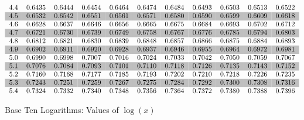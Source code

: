 \documentclass[12pt]{article}
\begin{document}
\begin{equation*}
\begin{tabular}{*{11}{c}}
4.4 & 0.6435 & 0.6444 & 0.6454 & 0.6464 & 0.6474 & 0.6484 & 0.6493 & 0.6503 & 0.6513 & 0.6522 \\
\rowcolor[gray]{0.75}
4.5 & 0.6532 & 0.6542 & 0.6551 & 0.6561 & 0.6571 & 0.6580 & 0.6590 & 0.6599 & 0.6609 & 0.6618 \\
4.6 & 0.6628 & 0.6637 & 0.6646 & 0.6656 & 0.6665 & 0.6675 & 0.6684 & 0.6693 & 0.6702 & 0.6712 \\
\rowcolor[gray]{0.75}
4.7 & 0.6721 & 0.6730 & 0.6739 & 0.6749 & 0.6758 & 0.6767 & 0.6776 & 0.6785 & 0.6794 & 0.6803 \\
4.8 & 0.6812 & 0.6821 & 0.6830 & 0.6839 & 0.6848 & 0.6857 & 0.6866 & 0.6875 & 0.6884 & 0.6893 \\
\rowcolor[gray]{0.75}
4.9 & 0.6902 & 0.6911 & 0.6920 & 0.6928 & 0.6937 & 0.6946 & 0.6955 & 0.6964 & 0.6972 & 0.6981 \\
5.0 & 0.6990 & 0.6998 & 0.7007 & 0.7016 & 0.7024 & 0.7033 & 0.7042 & 0.7050 & 0.7059 & 0.7067 \\
\rowcolor[gray]{0.75}
5.1 & 0.7076 & 0.7084 & 0.7093 & 0.7101 & 0.7110 & 0.7118 & 0.7126 & 0.7135 & 0.7143 & 0.7152 \\
5.2 & 0.7160 & 0.7168 & 0.7177 & 0.7185 & 0.7193 & 0.7202 & 0.7210 & 0.7218 & 0.7226 & 0.7235 \\
\rowcolor[gray]{0.75}  
5.3 & 0.7243 & 0.7251 & 0.7259 & 0.7267 & 0.7275 & 0.7284 & 0.7292 & 0.7300 & 0.7308 & 0.7316 \\
5.4 & 0.7324 & 0.7332 & 0.7340 & 0.7348 & 0.7356 & 0.7364 & 0.7372 & 0.7380 & 0.7388 & 0.7396 
\end{tabular}
\end{equation*}

\begin{center}
  \Large{}Base Ten Logarithms: Values of $\log(x)$
\end{center}
\newpage
\end{document}
